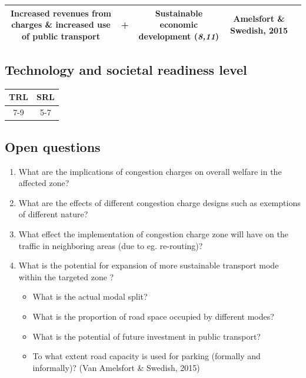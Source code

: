 \documentclass[
]{book}
\providecommand{\tightlist}{%
  \setlength{\itemsep}{0pt}\setlength{\parskip}{0pt}}
\begin{document}
\begin{longtable}[]{@{}ccccc@{}}
\begin{minipage}[t]{0.16\columnwidth}
Increased revenues from charges \& increased use of public transport\strut
\end{minipage} & \begin{minipage}[t]{0.17\columnwidth}\centering
\textbf{+}\strut
\end{minipage} & \begin{minipage}[t]{0.17\columnwidth}\centering
Sustainable economic development (\emph{8,11})\strut
\end{minipage} & \begin{minipage}[t]{0.17\columnwidth}\centering
Amelsfort \& Swedish, 2015\strut
\end{minipage}\tabularnewline
\bottomrule
\end{longtable}

\hypertarget{technology-and-societal-readiness-level-8}{%
\subsection*{Technology and societal readiness level}\label{technology-and-societal-readiness-level-8}}

\begin{longtable}[]{@{}cc@{}}
\toprule
TRL & SRL\tabularnewline
\midrule
\endhead
7-9 & 5-7\tabularnewline
\bottomrule
\end{longtable}

\hypertarget{open-questions-8}{%
\subsection*{Open questions}\label{open-questions-8}}

\begin{enumerate}
\def\labelenumi{\arabic{enumi}.}
\tightlist
\item
  What are the implications of congestion charges on overall welfare in the affected zone?
\item
  What are the effects of different congestion charge designs such as exemptions of different nature?
\item
  What effect the implementation of congestion charge zone will have on the traffic in neighboring areas (due to eg. re-routing)?
\item
  What is the potential for expansion of more sustainable transport mode within the targeted zone ?

  \begin{itemize}
  \tightlist
  \item
    What is the actual modal split?
  \item
    What is the proportion of road space occupied by different modes?
  \item
    What is the potential of future investment in public transport?
  \item
    To what extent road capacity is used for parking (formally and informally)? (Van Amelsfort \& Swedish, 2015)
  \end{itemize}
\end{enumerate}
\end{document}
